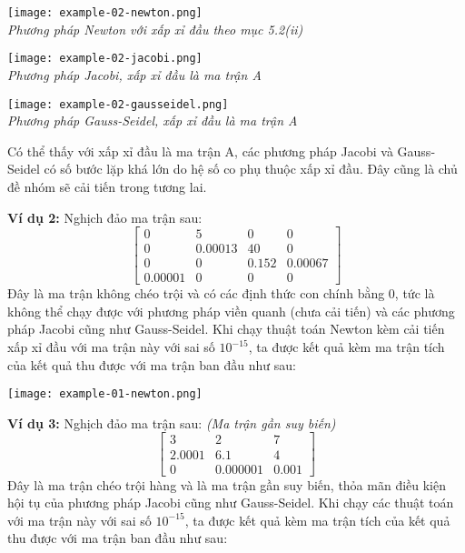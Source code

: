     \begin{center}
        \texttt{[image: example-02-newton.png]} \\
        \textit{Phương pháp Newton với xấp xỉ đầu theo mục 5.2(ii)}
        
        \texttt{[image: example-02-jacobi.png]} \\
        \textit{Phương pháp Jacobi, xấp xỉ đầu là ma trận A}
        
        \texttt{[image: example-02-gausseidel.png]} \\
        \textit{Phương pháp Gauss-Seidel, xấp xỉ đầu là ma trận A}
    \end{center}

    Có thể thấy với xấp xỉ đầu là ma trận A, các phương pháp Jacobi và Gauss-Seidel có số bước lặp khá lớn do hệ số co phụ thuộc xấp xỉ đầu. Đây cũng là chủ đề nhóm sẽ cải tiến trong tương lai.
        


    \textbf{Ví dụ 2:} Nghịch đảo ma trận sau:
    $$
        \begin{bmatrix}
            0         & 5       & 0     & 0       \\
            0         & 0.00013 & 40    & 0       \\
            0         & 0       & 0.152 & 0.00067 \\
            0.00001 & 0       & 0     & 0
        \end{bmatrix}
    $$
    Đây là ma trận không chéo trội và có các định thức con chính bằng 0, tức là không thể chạy được với phương pháp viền quanh (chưa cải tiến) và các phương pháp Jacobi cũng như Gauss-Seidel. Khi chạy thuật toán Newton kèm cải tiến xấp xỉ đầu với ma trận này với sai số $10^{-15}$, ta được kết quả kèm ma trận tích của kết quả thu được với ma trận ban đầu như sau: 

    \begin{center}
        \texttt{[image: example-01-newton.png]}
    \end{center}


    \textbf{Ví dụ 3:} Nghịch đảo ma trận sau: \textit{(Ma trận gần suy biến)}
    $$
        \begin{bmatrix}
            3      & 2        & 7 \\
            2.0001 & 6.1      & 4 \\
            0      & 0.000001 & 0.001
        \end{bmatrix}
    $$
    Đây là ma trận chéo trội hàng và là ma trận gần suy biến, thỏa mãn điều kiện hội tụ của phương pháp Jacobi cũng như Gauss-Seidel. Khi chạy các thuật toán với ma trận này với sai số $10^{-15}$, ta được kết quả kèm ma trận tích của kết quả thu được với ma trận ban đầu như sau: 

